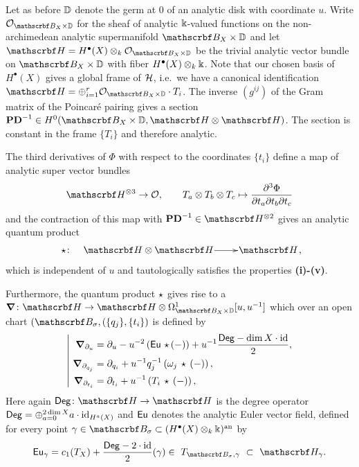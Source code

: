 \documentclass[twoside,leqno]{article}
\numberwithin{equation}{section}
\theoremstyle{plain}
\theoremstyle{definition}
\begin{document}
Let as before $\mathbb D$ denote the germ at $0$ of an analytic disk with coordinate $u$. Write $\cO_{\omB_{X}\times \bbD}$ for the sheaf of analytic $\Bbbk$-valued functions on the non-archimedean  analytic supermanifold $\omB_{X}\times \bbD$ and let $\omH = H^{\bullet}(X)\otimes_{k} \cO_{\omB_{X}\times \bbD}$ be the trivial analytic vector bundle on $\omB_{X}\times \bbD$ with fiber $H^{\bullet}(X)\otimes_{k} \Bbbk$. Note that our chosen basis of $H^{\bullet}(X)$ gives a global frame of $\mathcal H$, i.e.\ we have a canonical identification 
$\omH = \oplus_{i = 1}^{r} \cO_{\omB_{X}\times\bbD}\cdot T_{i}$.
The inverse $(g^{ij})$ of the Gram matrix of the Poincar\'{e} pairing gives a section $\mathbf{PD}^{-1} \in H^0(\omB_{X}\times \bbD,\omH\otimes \omH)$. The section is constant in the frame $\{ T_{i}\}$ and therefore analytic.  



\medskip


The third derivatives of $\Phi$ with respect to the coordinates 
$\{t_{i}\}$ define  a map of analytic super vector bundles
\[
\omH^{\otimes 3} \to \cO, \qquad T_{a}\otimes T_{b}\otimes T_{c} \mapsto \frac{\partial^3\Phi}{\partial t_{a} \partial t_{b} \partial t_{c}}
\]
and the contraction of this map with $\mathbf{PD}^{-1} \in \omH^{\otimes 2}$ gives an analytic quantum product
\[
\xymatrix@1{\qup \colon \hspace{-1.5pc} &  \omH\otimes \omH \ar[r] & \omH},
\]
which is independent of $u$ and tautologically satisfies the properties {\bfseries (i)-(v)}.

\medskip

Furthermore, the quantum product  $\star$ gives rise to a    $\bnabla \colon \omH \to \omH \otimes \Omega^1_{\omB_{X}\times \bbD}[u,u^{-1}]$
which over an open chart $(\omB_{\sigma}, (\{q_{j}\},\{t_{i}\})$ 
is defined by
\begin{equation} \label{eq:anbignabla}
\left| \ 
\begin{aligned}
\bnabla_{\partial_{u}} & = \partial_{u} - u^{-2} \left(\Eu \, \qup\, (-)\right) + u^{-1} \frac{\Deg - \dim X\cdot \op{id}}{2}, \\
\bnabla_{\partial_{q_{j}}} & = \partial_{q_{i}} + u^{-1}q_{j}^{-1} \left( \omega_{j} \, \qup \, (-)\right), \\
\bnabla_{\partial_{t_{i}}} & = \partial_{t_{i}} + u^{-1} \left( T_{i} \, \qup \, (-)\right),
\end{aligned}
\right.
\end{equation}
Here again  $\Deg \colon \omH \to \omH$ is the degree operator $\mathsf{Deg} = \oplus_{a = 0}^{2\dim X} a\cdot \operatorname{id}_{H^{a}(X)}$ and $\operatorname{\mathsf{Eu}}$ denotes the analytic Euler vector field, defined for every point 
$\gamma \in \omB_{\sigma} \subset (H^{\bullet}(X)\otimes_{k}  \bbk)^{\op{an}}$ by 
\begin{equation} \label{eq:Euan}
\Eu_{\gamma} = c_{1}(T_{X}) + \frac{\Deg - 2\cdot \op{id}}{2}(\gamma)
\in  \ T_{\omB_{\sigma},\gamma} \ \subset \ \omH_{\gamma}.
\end{equation}
\end{document}
